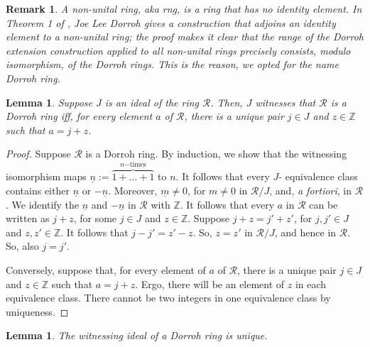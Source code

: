 \documentclass{amsart}
\newtheorem{lem}[theorem]{Lemma}
\newtheorem{rem}[theorem]{Remark}
\newcommand{\mc}[1]{\mathcal #1}
\newcommand{\num}[1]{{\underline {#1}}}
\begin{document}
\begin{rem}\label{Dorroh_explanation}
    A \emph{non-unital ring}, aka \emph{rng}, is a ring that has no identity element. In Theorem 1 of \cite{dorr:conc32}, Joe Lee Dorroh gives a construction that adjoins an identity element to a non-unital ring; the proof makes it clear that the range of the Dorroh extension construction applied to all non-unital rings precisely consists, modulo isomorphism,
    of the Dorroh rings. This is the reason, we opted for the name \emph{Dorroh ring}.
\end{rem}


\begin{lem}\label{lem_char_dorroh}
Suppose $J$ is an ideal of the ring $\mc R$. Then, $J$ witnesses that  $\mc R$ is a Dorroh ring iff, for every element $a$ of $\mc R$, there is
    a unique pair $j\in J$ and $z\in \mathbb Z$ such that $a=j+z$.
\end{lem}

\begin{proof}
Suppose $\mc R$ is a Dorroh ring. By induction, we show that the witnessing isomorphism maps $\num n:=\overbrace{1+\ldots+1}^{n\mathrm{-times}}$ to $n$. It follows that
    every $J$- equivalence class contains either $\num n$ or $-\num n$. Moreover, $\num m\neq 0$, for $m\neq 0$ in
    $\mc R/J$, and, \emph{a fortiori}, in $\mc R$.  We identify the $\num n$ and $-\num n$ in $\mc R$ with $\mathbb Z$.
    It follows that every $a$ in $\mc R$ can be written as $j+z$, for some $j \in J$ and $z\in \mathbb Z$. 
    Suppose $j+z=j'+z'$, for $j,j'\in J$ and $z,z'\in \mathbb Z$. It follows that $j-j' = z'-z$. 
    So, $z=z'$ in $\mc R/J$, and hence in $\mc R$. So, also $j=j'$.

    Conversely,  suppose that, for every element of $a$ of $\mc R$, there is
    a unique pair $j\in J$ and $z\in \mathbb Z$ such that $a=j+z$.
    Ergo, there will be an element of $z$ in each equivalence class.
    There cannot be two integers in one equivalence class by uniqueness.
\end{proof}

\begin{lem}
    The witnessing ideal of a Dorroh ring is unique.
\end{lem}
\end{document}
